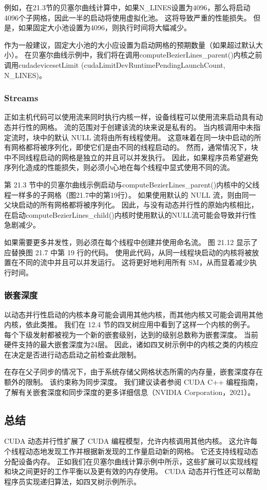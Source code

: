 例如，在21.3节的贝塞尔曲线计算中，如果N\_LINES设置为4096，那么将启动4096个子网格，因此一半的启动将使用虚拟化池。 这将导致严重的性能损失。 但是，如果固定大小池设置为4096，则执行时间将大幅减少。

作为一般建议，固定大小池的大小应设置为启动网格的预期数量（如果超过默认大小）。 在贝塞尔曲线示例中，我们将在调用computeBezierLines\_parent()内核之前调用cudadevicesetLimit (cudaLimitDevRuntimePendingLaunchCount, N\_LINES)。

\subsubsection{Streams}
正如主机代码可以使用流来同时执行内核一样，设备线程可以使用流来启动具有动态并行性的网格。 流的范围对于创建该流的块来说是私有的。 当内核调用中未指定流时，块中的默认 NULL 流将由所有线程使用。 这意味着在同一块中启动的所有网格都将被序列化，即使它们是由不同的线程启动的。 然而，通常情况下，块中不同线程启动的网格是独立的并且可以并发执行。 因此，如果程序员希望避免序列化造成的性能损失，则必须小心地在每个线程中显式使用不同的流。

第 21.3 节中的贝塞尔曲线示例启动与computeBezierLines\_parent()内核中的父线程一样多的子网格（图21.7中的第19行）。 如果使用默认的 NULL 流，则由同一父块启动的所有网格都将被序列化。 因此，与没有动态并行性的原始内核相比，在启动computeBezierLines\_child()内核时使用默认的NULL流可能会导致并行性急剧减少。

如果需要更多并发性，则必须在每个线程中创建并使用命名流。 图 21.12 显示了应替换图 21.7 中第 19 行的代码。 使用此代码，从同一线程块启动的内核将被放置在不同的流中并且可以并发运行。 这将更好地利用所有 SM，从而显着减少执行时间。

\subsubsection{嵌套深度}
以动态并行性启动的内核本身可能会调用其他内核，而其他内核又可能会调用其他内核，依此类推。 我们在 12.4 节的四叉树应用中看到了这样一个内核的例子。 每个下级发射都被视为一个新的嵌套级别，达到的级别总数称为嵌套深度。 当前硬件支持的最大嵌套深度为24层。 因此，诸如四叉树示例中的内核之类的内核应在决定是否进行动态启动之前检查此限制。

在存在父子同步的情况下，由于系统存储父网格状态所需的内存量，嵌套深度存在额外的限制。 该约束称为同步深度。 我们建议读者参阅 CUDA C++ 编程指南，了解有关嵌套深度和同步深度的更多详细信息（NVIDIA Corporation，2021）。

\subsection{总结}
CUDA 动态并行性扩展了 CUDA 编程模型，允许内核调用其他内核。 这允许每个线程动态地发现工作并根据新发现的工作量启动新的网格。 它还支持线程动态分配设备内存。 正如我们在贝塞尔曲线计算示例中所示，这些扩展可以实现线程和块之间更好的工作平衡以及更有效的内存使用。 CUDA 动态并行性还可以帮助程序员实现递归算法，如四叉树示例所示。

